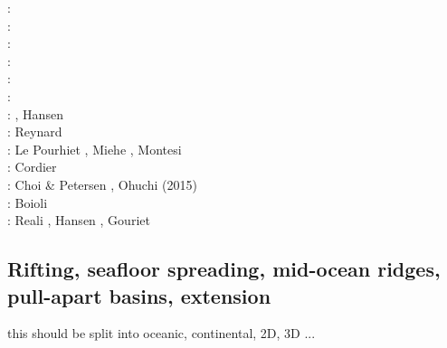 \begin{scriptsize}
\twothousandthree: \cite{hiko03}\cite{kaju03}\cite{mohi03}\\
\twothousandfive: \cite{didr05}\cite{drur05}\\
\twothousandsix: \cite{rygw06}\cite{buwa06}\cite{momu06}\cite{liwr06}\\
\twothousandseven: \cite{hirw07}\cite{kohl07}\cite{faja07}\\
\twothousandeight: \cite{lemm08}\cite{budr08}\cite{koka08}\cite{gird08}\\
\twothousandnine: \cite{kayk09}\cite{kako09}\\
\twothousandeleven: \cite{lell11}\cite{kemk11}, Hansen \etal \cite{hazk11}\\
\twothousandtwelve: Reynard \cite{reyn12}\\
\twothousandthirteen: Le Pourhiet \cite{lepo13}, Miehe \etal \cite{miam13}, Montesi \cite{mont13}\\
\twothousandfourteen: Cordier \etal \cite{codb14}\\
\twothousandfifteen: Choi \& Petersen \cite{chpe15}, Ohuchi \etal (2015) \cite{ohkh15}\\
\twothousandseventeen: Boioli \etal \cite{bocc17}\\
\twothousandnineteen: Reali \etal \cite{rejv19}, Hansen \etal \cite{hakt19}, Gouriet \etal \cite{gocg19}
\end{scriptsize}

\subsection{Rifting, seafloor spreading, mid-ocean ridges, pull-apart basins, extension}

{\color{red} this should be split into oceanic, continental, 2D, 3D ...}

